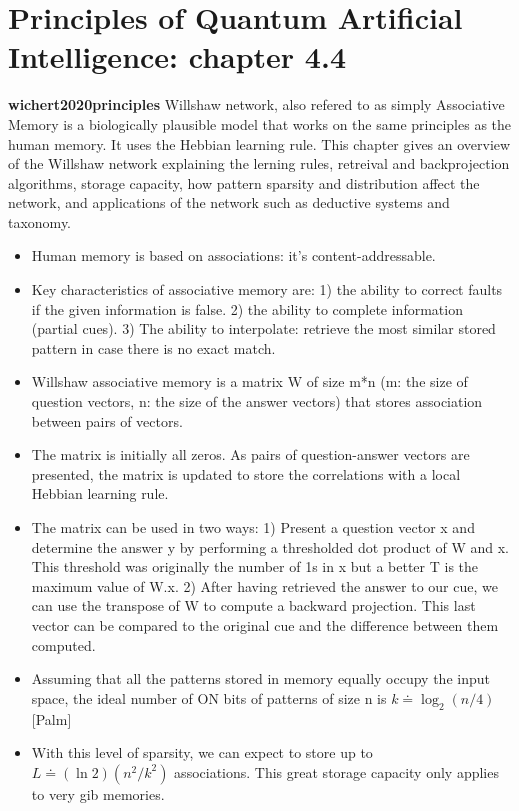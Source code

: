 \documentclass{article}
\begin{document}
\section{Principles of Quantum Artificial Intelligence: chapter 4.4}
\textbf{wichert2020principles} \cite{wichert2020principles}\newline
Willshaw network, also refered to as  simply Associative Memory is a biologically plausible model that works on the same principles as the human memory. It uses the Hebbian learning rule. This chapter gives an overview of the Willshaw network explaining the lerning rules, retreival and backprojection algorithms, storage capacity, how pattern sparsity and distribution affect the network, and applications of the network such as deductive systems and taxonomy.
\begin{itemize}
\item Human memory is based on associations: it's content-addressable.
\item Key characteristics of associative memory are: 1) the ability to correct faults if the given information is false.    2) the ability to complete information (partial cues).    3) The ability to interpolate: retrieve the most similar stored pattern in case there is no exact match.
\item Willshaw associative memory is a matrix W of size m*n (m: the size of question vectors, n: the size of the answer vectors) that stores association between pairs of vectors.
\item The matrix is initially all zeros. As pairs of question-answer vectors are presented, the matrix is updated to store the correlations with a local Hebbian learning rule.
\item The matrix can be used in two ways: 1) Present a question vector x and determine the answer y by performing a thresholded dot product of W and x. This threshold was originally the number of 1s in x but a better T is the maximum value of W.x.    2) After having retrieved the answer to our cue, we can use the transpose of W to compute a backward projection. This last vector can be compared to the original cue and the difference between them computed.
\item Assuming that all the patterns stored in memory equally occupy the input space, the ideal number of ON bits of patterns of size n is $k \doteq \log _{2}(n / 4)$ [Palm]
\item With this level of sparsity, we can expect to store up to 
$L \doteq(\ln 2)\left(n^{2} / k^{2}\right)$ associations. This great storage capacity only applies to very gib memories.

\end{itemize}
\end{document}
